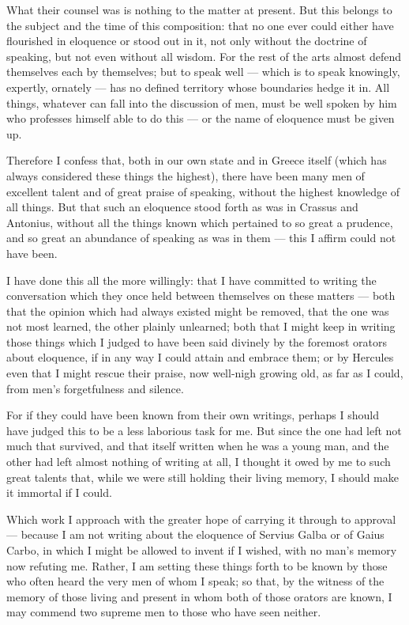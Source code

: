  What their counsel was is nothing to the matter at present. But this belongs to the subject and the time of this composition: that no one ever could either have flourished in eloquence or stood out in it, not only without the doctrine of speaking, but not even without all wisdom. For the rest of the arts almost defend themselves each by themselves; but to speak well — which is to speak knowingly, expertly, ornately — has no defined territory whose boundaries hedge it in. All things, whatever can fall into the discussion of men, must be well spoken by him who professes himself able to do this — or the name of eloquence must be given up.

 Therefore I confess that, both in our own state and in Greece itself (which has always considered these things the highest), there have been many men of excellent talent and of great praise of speaking, without the highest knowledge of all things. But that such an eloquence stood forth as was in Crassus and Antonius, without all the things known which pertained to so great a prudence, and so great an abundance of speaking as was in them — this I affirm could not have been.

 I have done this all the more willingly: that I have committed to writing the conversation which they once held between themselves on these matters — both that the opinion which had always existed might be removed, that the one was not most learned, the other plainly unlearned; both that I might keep in writing those things which I judged to have been said divinely by the foremost orators about eloquence, if in any way I could attain and embrace them; or by Hercules even that I might rescue their praise, now well-nigh growing old, as far as I could, from men's forgetfulness and silence.

 For if they could have been known from their own writings, perhaps I should have judged this to be a less laborious task for me. But since the one had left not much that survived, and that itself written when he was a young man, and the other had left almost nothing of writing at all, I thought it owed by me to such great talents that, while we were still holding their living memory, I should make it immortal if I could.

 Which work I approach with the greater hope of carrying it through to approval — because I am not writing about the eloquence of Servius Galba or of Gaius Carbo, in which I might be allowed to invent if I wished, with no man's memory now refuting me. Rather, I am setting these things forth to be known by those who often heard the very men of whom I speak; so that, by the witness of the memory of those living and present in whom both of those orators are known, I may commend two supreme men to those who have seen neither.

